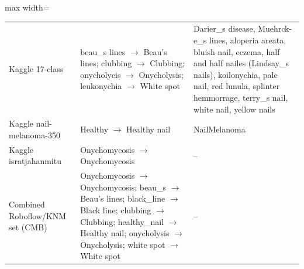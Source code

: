 \begin{table}[!htb]
\begin{adjustbox}{max width=\linewidth}
\begin{tabular}{p{3.6cm}p{8.4cm}p{4.6cm}}
Kaggle 17-class & beau\_s lines $\to$ Beau's lines; clubbing $\to$ Clubbing; onycholycis $\to$ Onycholysis; leukonychia $\to$ White spot & Darier\_s disease, Muehrck-e\_s lines, aloperia areata, bluish nail, eczema, half and half nailes (Lindsay\_s nails), koilonychia, pale nail, red lunula, splinter hemmorrage, terry\_s nail, white nail, yellow nails \\
Kaggle nail-melanoma-350 & Healthy $\to$ Healthy nail & NailMelanoma \\
Kaggle isratjahanmitu & Onychomycosis $\to$ Onychomycosis & -- \\
Combined Roboflow/KNM set (CMB) & Onychomycosis $\to$ Onychomycosis; beau\_s $\to$ Beau's lines; black\_line $\to$ Black line; clubbing $\to$ Clubbing; healthy\_nail $\to$ Healthy nail; onycholysis $\to$ Onycholysis; white spot $\to$ White spot & -- \\
\hline
\end{tabular}
\end{adjustbox}
\end{table}
